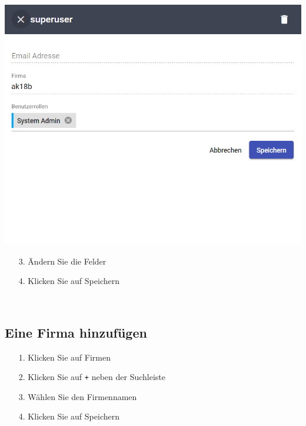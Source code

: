 \documentclass[11pt,a4paper]{report}
\begin{document}
	\begin{minipage}{0.5\linewidth}
	\includegraphics[width=\linewidth]{Benutzeredit.png}
	\end{minipage}
	\hfill
	\begin{minipage}{0.4\linewidth}
	\begin{itemize}
		\item[3.] Ändern Sie die Felder
		\item[4.] Klicken Sie auf Speichern
	\end{itemize}
	\end{minipage}\\

	\subsection{Eine Firma hinzufügen}
	
	\begin{itemize}
		\item[1.] Klicken Sie auf \glqq{}Firmen\grqq{}
		\item[2.] Klicken Sie auf \texttt{+} neben der Suchleiste
		\item[3.] Wählen Sie den Firmennamen
		\item[4.] Klicken Sie auf Speichern
	\end{itemize}
\end{document}
